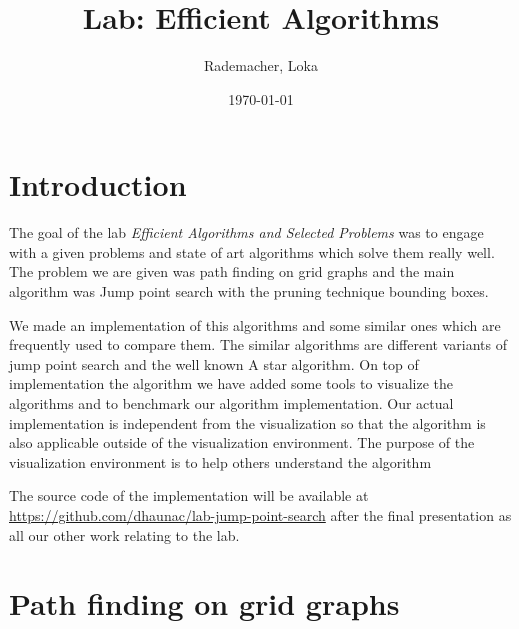 \documentclass{article}
\begin{document}
    \title{Lab: Efficient Algorithms}  %
    \author{Rademacher, Loka}
    \date{\today}

    \thispagestyle{empty}
    \begin{center}
        \noindent
        \makebox[0pt][r]{\thedate}
        
        
        \noindent
        \centerline{\huge \sc \thetitle}
        
        \vspace*{-2pt}
        
        \noindent
        \centerline{\large {\theauthor}}
    \end{center}
    
    
    
    \section{Introduction}
    
    The goal of the lab \textit{Efficient Algorithms and Selected Problems} was to engage with a given problems and state of art algorithms which solve them really well. The problem we are given was path finding on grid graphs and the main algorithm was Jump point search with the pruning technique bounding boxes.
    
    We made an implementation of this algorithms and some similar ones which are frequently used to compare them. The similar algorithms are different variants of jump point search and the well known A star algorithm. On top of implementation the algorithm we have added some tools to visualize the algorithms and to benchmark our algorithm implementation. Our actual implementation is independent from the visualization so that the algorithm is also applicable outside of the visualization environment. The purpose of the visualization environment is to help others understand the algorithm 
    
    The source code of the implementation will be available at \url{https://github.com/dhaunac/lab-jump-point-search} after the final presentation as all our other work relating to the lab.
    
    
    
    \section{Path finding on grid graphs}
    
\end{document}
